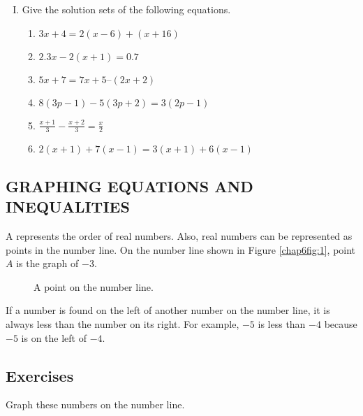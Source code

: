 \begin{enumerate}[I.]
\item Give the solution sets of the following equations.
	\begin{enumerate}[1.]
	\item $3x +4 = 2(x - 6) + (x + 16)$
	\item $2.3 x-2(x + 1) = 0.7$
	\item $5x + 7 = 7x + 5 – (2x + 2)$\\
	\item $8(3p-1)-5(3p + 2) = 3(2p-1)$
	\item $\frac{x+1}{3}-\frac{x+2}{3}=\frac{x}{2}$
	\item $2(x + 1) + 7(x-1) = 3(x + 1) + 6(x-1)$
	\end{enumerate}
\end{enumerate}

\subsection*{GRAPHING EQUATIONS AND INEQUALITIES}
A  represents the order of real numbers. Also, real numbers can be represented as points in the number line. On the number line shown in Figure \eqref{chap6fig:1}, point $A$ is the graph of $-3$.
\begin{figure}[!h]
\centering
\caption{A point on the number line.}
\label{chap6fig:1}
\end{figure}

If a number is found on the left of another number on the number line, it is always less than the number on its right. For example, $-5$ is less than $-4$ because $-5$ is on the left of $-4$.

\subsection*{Exercises}
Graph these numbers on the number line.

